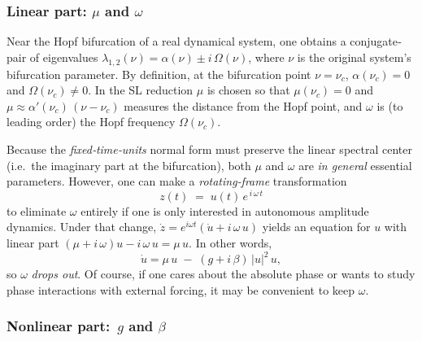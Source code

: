 \subsubsection{Linear part: \(\mu\) and \(\omega\)}

Near the Hopf bifurcation of a real dynamical system, one obtains a conjugate‐pair of eigenvalues 
\(\lambda_{1,2}(\nu) = \alpha(\nu) \pm i\,\Omega(\nu)\), 
where \(\nu\) is the original system’s bifurcation parameter.  By definition, at the bifurcation point \(\nu=\nu_c\), \(\alpha(\nu_c)=0\) and \(\Omega(\nu_c)\neq0\).  In the SL reduction  \(\mu\) is chosen so that \(\mu(\nu_c)=0\) and \(\mu\approx \alpha'(\nu_c)\,(\nu-\nu_c)\) measures the distance from the Hopf point, and 
 \(\omega\) is (to leading order) the Hopf frequency \(\Omega(\nu_c)\).  

Because the \emph{fixed‐time‐units} normal form must preserve the linear spectral center (i.e.\ the imaginary part at the bifurcation), both \(\mu\) and \(\omega\) are \emph{in general} essential parameters.  However, one can make a \emph{rotating‐frame} transformation 
\[
z(t) \;=\; u(t)\,e^{\,i\,\omega\,t}
\]
to eliminate \(\omega\) entirely if one is only interested in autonomous amplitude dynamics.  Under that change, 
\(\dot z = e^{i\omega t}(\dot u + i\,\omega\,u)\) 
yields an equation for \(u\) with linear part \((\mu + i\,\omega)u - i\,\omega\,u = \mu\,u\).  In other words, 
\[
\dot u 
= \mu\,u \;-\; (g + i\,\beta)\,\lvert u\rvert^2\,u,
\]
so \(\omega\) \emph{drops out}.  Of course, if one cares about the absolute phase or wants to study phase interactions with external forcing, it may be convenient to keep \(\omega\).  

\subsubsection{Nonlinear part: \(\,g\) and \(\beta\)}

